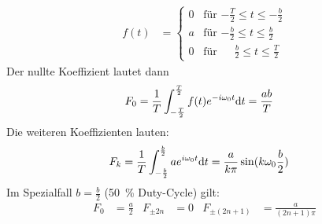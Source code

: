 \begin{align}\label{rechtecksfunktion}
  f(t)&=\left\{
        \begin{array}{ll}
          0&\text{für $-\frac{T}{2}\leq t\leq -\frac{b}{2}$}\\
          a&\text{für $-\frac{b}{2}\leq t\leq \frac{b}{2}$}\\
          0&\text{für $\phantom{-}\frac{b}{2}\leq t\leq \frac{T}{2}$}
        \end{array}
             \right.
\end{align}
Der nullte Koeffizient lautet dann
\begin{align*}
  F_0 &= \frac{1}{T} \int_{-\frac{T}{2}}^{\frac{T}{2}}
        f(t)e^{-i\omega_0 t}\mathrm{d} t
        = \frac{ab}{T}
\end{align*}
Die weiteren Koeffizienten lauten:
\begin{align*}
  F_k &= \frac{1}{T} \int_{-\frac{b}{2}}^{\frac{b}{2}} 
        ae^{i\omega_0 t}\mathrm{d} t
        = \frac{a}{k\pi}\sin(k\omega_0\frac{b}{2})
\end{align*}
Im Spezialfall $b=\frac{b}{2}$ (\SI{50}{\percent} Duty-Cycle) gilt:
\begin{align*}
  F_0 &= \frac{a}{2}
  &F_{\pm 2n} &= 0
  &F_{\pm (2n+1)} &= \frac{a}{(2n+1)\pi}
\end{align*}


